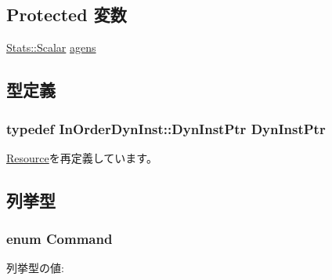 \subsection*{Protected 変数}
\begin{DoxyCompactItemize}
\item 
\hyperlink{classStats_1_1Scalar}{Stats::Scalar} \hyperlink{classAGENUnit_af050796f6e4377dc1312864abd020b87}{agens}
\end{DoxyCompactItemize}


\subsection{型定義}
\hypertarget{classAGENUnit_a32d1573770d3d1d96a1741ac80433e33}{
\subsubsection[{DynInstPtr}]{\setlength{\rightskip}{0pt plus 5cm}typedef {\bf InOrderDynInst::DynInstPtr} {\bf DynInstPtr}}}
\label{classAGENUnit_a32d1573770d3d1d96a1741ac80433e33}


\hyperlink{classResource_af9d0c8a46736ba6aa2d8bb94da1a5e73}{Resource}を再定義しています。

\subsection{列挙型}
\hypertarget{classAGENUnit_a2afce0a47a93eee73a314d53e4890153}{
\subsubsection[{Command}]{\setlength{\rightskip}{0pt plus 5cm}enum {\bf Command}}}
\label{classAGENUnit_a2afce0a47a93eee73a314d53e4890153}
\begin{Desc}
\item[列挙型の値: ]\par
\begin{description}
\item[{\em 
\hypertarget{classAGENUnit_a2afce0a47a93eee73a314d53e4890153a33308417f8eb8f4e3673faee9003d120}{
GenerateAddr}
\label{classAGENUnit_a2afce0a47a93eee73a314d53e4890153a33308417f8eb8f4e3673faee9003d120}
}]\end{description}
\end{Desc}




